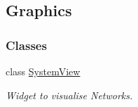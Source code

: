 \hypertarget{group___graphics}{}\subsection{Graphics}
\label{group___graphics}
\subsubsection*{Classes}
\begin{DoxyCompactItemize}
\item 
class \hyperlink{class_system_view}{System\+View}
\begin{DoxyCompactList}\small\item\em Widget to visualise Networks. \end{DoxyCompactList}\end{DoxyCompactItemize}
